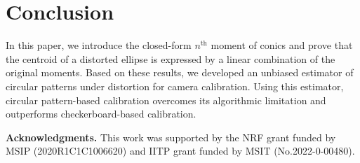 \section{Conclusion}
\label{sec:conclusion}
In this paper, we introduce the closed-form $n^{\text{th}}$ moment of conics and prove that the centroid of a distorted ellipse is expressed by a linear combination of the original moments. Based on these results, we developed an unbiased estimator of circular patterns under distortion for camera calibration. Using this estimator, circular pattern-based calibration overcomes its algorithmic limitation and outperforms checkerboard-based calibration. 

\vspace{5mm}
\noindent \textbf{Acknowledgments.} This work was supported by the NRF grant funded by MSIP (2020R1C1C1006620) and IITP grant funded by MSIT (No.2022-0-00480).